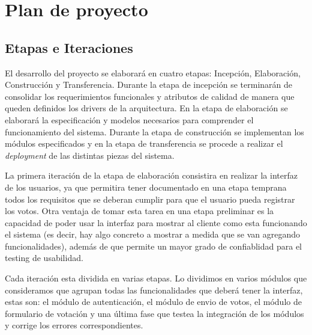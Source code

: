 \section{Plan de proyecto}

\subsection{Etapas e Iteraciones}

El desarrollo del proyecto se elaborar\'a en cuatro etapas: Incepción, Elaboración, Construcción y Transferencia. Durante la etapa de incepción se terminar\'an de consolidar los requerimientos funcionales y atributos de calidad de manera que queden definidos los drivers de la arquitectura. En la etapa de elaboración se elaborar\'a la especificación y modelos necesarios para comprender el funcionamiento del sistema. Durante la etapa de construcción se implementan los m\'odulos especificados y en la etapa de transferencia se procede a realizar el \textit{deployment} de las distintas piezas del sistema.  
\\ \par

La primera iteración de la etapa de elaboración consistira en realizar la interfaz de los usuarios, ya que permitira tener documentado en una etapa temprana todos los requisitos que se deberan cumplir para que el usuario pueda registrar los votos. Otra ventaja de tomar esta tarea en una etapa preliminar es la capacidad de poder usar la interfaz para mostrar al cliente como esta funcionando el sistema (es decir, hay algo concreto a mostrar a medida que se van agregando funcionalidades), además de que permite un mayor grado de confiablidad para el testing de usabilidad. 
\\ \par
Cada iteración esta dividida en varias etapas. Lo dividimos en varios m\'odulos que consideramos que agrupan todas las funcionalidades que deber\'a tener la interfaz, estas son: el m\'odulo de autenticación, el m\'odulo de envio de votos, el m\'odulo de formulario de votaci\'on y una \'ultima fase que testea la integraci\'on de los m\'odulos y corrige los errores correspondientes.

